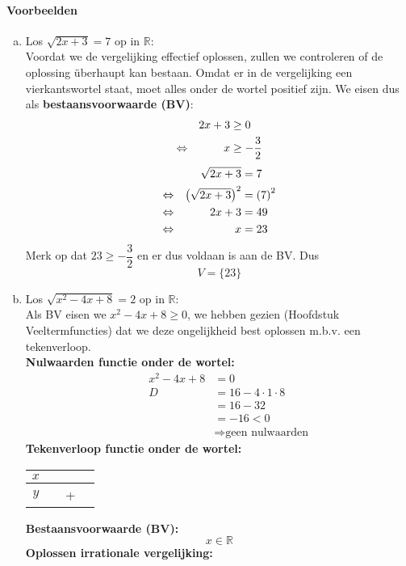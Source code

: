 \documentclass[12pt,twoside]{article}
\begin{document}
\paragraph*{Voorbeelden}
\begin{enumerate}[(a)]
  \item Los $\sqrt{2x+3}=7$ op in $\mathbb{R}$:\\
  Voordat we de vergelijking effectief oplossen, zullen we controleren of de oplossing überhaupt kan bestaan. Omdat er in de vergelijking een vierkantswortel staat, moet alles onder de wortel positief zijn. We eisen dus als {\bf bestaansvoorwaarde (BV)}:
  \begin{align*}
         && 2x+3 &\geq 0 \\
    \Leftrightarrow && x &\geq -\dfrac{3}{2}
  \end{align*}
  \begin{align*}
         && \sqrt{2x+3} &= 7 \\
    \Leftrightarrow && \left(\sqrt{2x+3}\right)^2 &= \left(7\right)^2\\
    \Leftrightarrow && 2x+3 &= 49\\
    \Leftrightarrow && x &= 23\\
  \end{align*}
  Merk op dat $23\geq -\dfrac{3}{2}$ en er dus voldaan is aan de BV. Dus
  $$V=\{23\}$$
  \item Los $\sqrt{x^2-4x+8}=2$ op in $\mathbb{R}$:\\
  Als BV eisen we $x^2-4x+8\geq 0$, we hebben gezien (Hoofdstuk Veeltermfuncties) dat we deze ongelijkheid best oplossen m.b.v. een tekenverloop.\\
  {\bf Nulwaarden functie onder de wortel:}
  \begin{align*}
         && x^2-4x+8 &= 0\\
         && D &= 16-4\cdot 1\cdot 8\\
         &&   &= 16-32\\
         &&   &= -16 < 0\\
         && &\Rightarrow \text{geen nulwaarden}
  \end{align*}
  {\bf Tekenverloop functie onder de wortel:}
  \begin{center}
    \begin{tabular}{c|ccc}
    $x$ & & & \\
    \hline
    $y$ & & + &
    \end{tabular}
  \end{center}
  {\bf Bestaansvoorwaarde (BV):}
  $$x\in\mathbb{R}$$
  {\bf Oplossen irrationale vergelijking:}

\end{enumerate}
\end{document}
